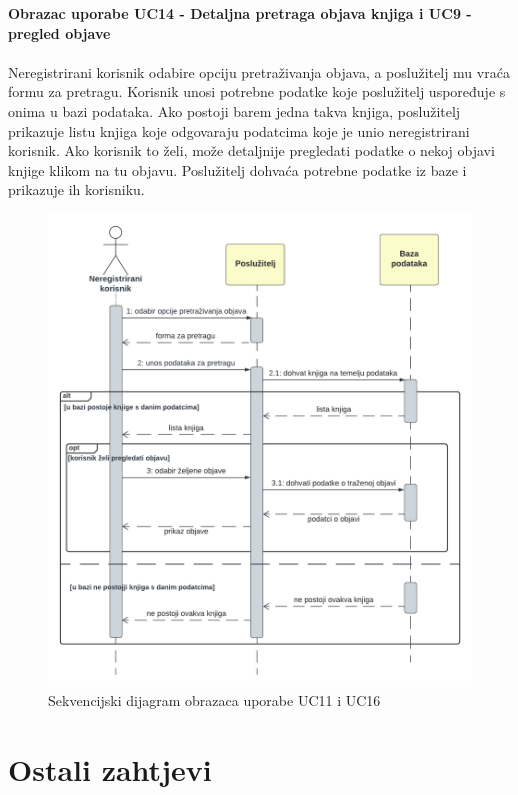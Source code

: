 				\textbf{Obrazac uporabe UC14 - Detaljna pretraga objava knjiga i UC9 - pregled objave}\\\\
				Neregistrirani korisnik odabire opciju pretraživanja objava, a poslužitelj mu vraća formu za pretragu. Korisnik unosi potrebne podatke koje poslužitelj uspoređuje s onima u bazi podataka. Ako postoji barem jedna takva knjiga, poslužitelj prikazuje listu knjiga koje odgovaraju podatcima koje je unio neregistrirani korisnik. Ako korisnik to želi, može detaljnije pregledati podatke o nekoj objavi knjige klikom na tu objavu. Poslužitelj dohvaća potrebne podatke iz baze i prikazuje ih korisniku.\\
				
				\begin{figure}[htbp]
					\centering
					\includegraphics[width = \textwidth]{slike/sekvUC16.PNG}
					\caption{Sekvencijski dijagram obrazaca uporabe UC11 i UC16}
					\label{fig:enter-label}
				\end{figure}
				\eject
	
	
		\section{Ostali zahtjevi}
		
